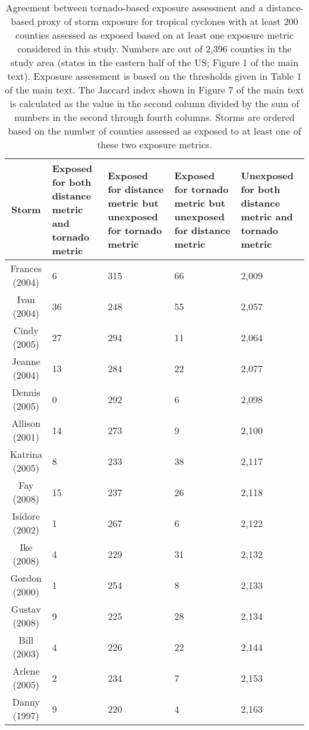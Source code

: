 \begin{table}[ht]
\centering
\caption{Agreement between tornado-based exposure assessment and a distance-based
         proxy of storm exposure for tropical cyclones with at least 200 counties assessed 
         as exposed based on at least one exposure metric considered in this study. Numbers 
         are out of 2,396 counties in the study area (states in the eastern half of the US; 
         Figure 1 of the main text). Exposure assessment is based on the thresholds given in 
         Table 1 of the main text. The Jaccard index shown in Figure 7 of the main text is 
         calculated as the value in the second column divided by the sum of numbers in the 
         second through fourth columns.  Storms are ordered based on the number of counties 
         assessed as exposed to at least one of these two exposure metrics.} 
\label{tab:misclasstornado}
\begin{tabular}{cP{3cm}P{3cm}P{3cm}P{3cm}}
  \toprule
Storm & Exposed for both distance metric and tornado metric & Exposed for distance metric but unexposed for tornado metric & Exposed for tornado metric but unexposed for distance metric & Unexposed for both distance metric and tornado metric \\ 
  \midrule
Frances (2004) & 6 & 315 & 66 & 2,009 \\ 
  Ivan (2004) & 36 & 248 & 55 & 2,057 \\ 
  Cindy (2005) & 27 & 294 & 11 & 2,064 \\ 
  Jeanne (2004) & 13 & 284 & 22 & 2,077 \\ 
  Dennis (2005) & 0 & 292 & 6 & 2,098 \\ 
  Allison (2001) & 14 & 273 & 9 & 2,100 \\ 
  Katrina (2005) & 8 & 233 & 38 & 2,117 \\ 
  Fay (2008) & 15 & 237 & 26 & 2,118 \\ 
  Isidore (2002) & 1 & 267 & 6 & 2,122 \\ 
  Ike (2008) & 4 & 229 & 31 & 2,132 \\ 
  Gordon (2000) & 1 & 254 & 8 & 2,133 \\ 
  Gustav (2008) & 9 & 225 & 28 & 2,134 \\ 
  Bill (2003) & 4 & 226 & 22 & 2,144 \\ 
  Arlene (2005) & 2 & 234 & 7 & 2,153 \\ 
  Danny (1997) & 9 & 220 & 4 & 2,163 \\ 

\end{tabular}
\end{table}
